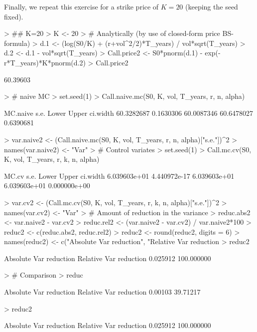 \documentclass{article}
\begin{document}
\vspace{16pt}
Finally, we repeat this exercise for a strike price of $K = 20$ (keeping the seed fixed).
\begin{Schunk}
\begin{Sinput}
> ## K=20
> K <- 20
> # Analytically (by use of closed-form price BS-formula)
> d.1 <- (log(S0/K) + (r+vol^2/2)*T_years) / vol*sqrt(T_years)
> d.2 <- d.1 - vol*sqrt(T_years)
> Call.price2 <- S0*pnorm(d.1) - exp(-r*T_years)*K*pnorm(d.2)
> Call.price2
\end{Sinput}
\begin{Soutput}
[1] 60.39603
\end{Soutput}
\begin{Sinput}
> # naive MC
> set.seed(1)
> Call.naive.mc(S0, K, vol, T_years, r, n, alpha)
\end{Sinput}
\begin{Soutput}
  MC.naive       s.e.      Lower      Upper   ci.width 
60.3282687  0.1630306 60.0087346 60.6478027  0.6390681 
\end{Soutput}
\begin{Sinput}
> var.naive2 <- (Call.naive.mc(S0, K, vol, T_years, r, n, alpha)["s.e."])^2
> names(var.naive2) <- "Var"
> # Control variates
> set.seed(1)
> Call.mc.cv(S0, K, vol, T_years, r, k, n, alpha)
\end{Sinput}
\begin{Soutput}
       MC.cv         s.e.        Lower        Upper     ci.width 
6.039603e+01 4.440972e-17 6.039603e+01 6.039603e+01 0.000000e+00 
\end{Soutput}
\begin{Sinput}
> var.cv2 <- (Call.mc.cv(S0, K, vol, T_years, r, k, n, alpha)["s.e."])^2
> names(var.cv2) <- "Var"
> # Amount of reduction in the variance
> reduc.abs2 <- var.naive2 - var.cv2
> reduc.rel2 <- (var.naive2 - var.cv2) / var.naive2*100
> reduc2 <- c(reduc.abs2, reduc.rel2)
> reduc2  <- round(reduc2, digits = 6)
> names(reduc2) <- c("Absolute Var reduction", "Relative Var reduction %
> reduc2
\end{Sinput}
\begin{Soutput}
  Absolute Var reduction Relative Var reduction %
                0.025912               100.000000 
\end{Soutput}
\begin{Sinput}
> # Comparison
> reduc
\end{Sinput}
\begin{Soutput}
  Absolute Var reduction Relative Var reduction %
                 0.00103                 39.71217 
\end{Soutput}
\begin{Sinput}
> reduc2
\end{Sinput}
\begin{Soutput}
  Absolute Var reduction Relative Var reduction %
                0.025912               100.000000 
\end{Soutput}
\end{Schunk}
\end{document}
